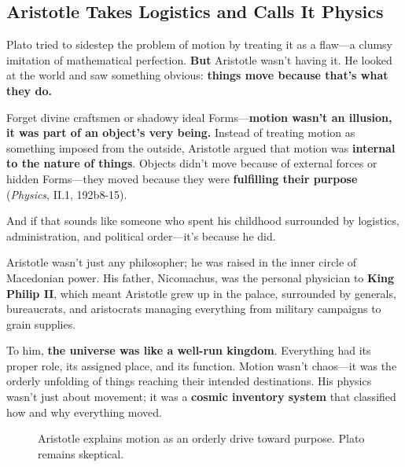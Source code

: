 \subsection{Aristotle Takes Logistics and Calls It Physics}

Plato tried to sidestep the problem of motion by treating it as a flaw—a clumsy imitation of mathematical perfection. \textbf{But} Aristotle wasn’t having it. He looked at the world and saw something obvious: \textbf{things move because that’s what they do.}  

Forget divine craftsmen or shadowy ideal Forms—\textbf{motion wasn’t an illusion, it was part of an object’s very being.} Instead of treating motion as something imposed from the outside, Aristotle argued that motion was \textbf{internal to the nature of things}. Objects didn’t move because of external forces or hidden Forms—they moved because they were \textbf{fulfilling their purpose} (\textit{Physics}, II.1, 192b8-15).  

And if that sounds like someone who spent his childhood surrounded by logistics, administration, and political order—it’s because he did.  

Aristotle wasn’t just any philosopher; he was raised in the inner circle of Macedonian power. His father, Nicomachus, was the personal physician to \textbf{King Philip II}, which meant Aristotle grew up in the palace, surrounded by generals, bureaucrats, and aristocrats managing everything from military campaigns to grain supplies.  

To him, \textbf{the universe was like a well-run kingdom}. Everything had its proper role, its assigned place, and its function. Motion wasn’t chaos—it was the orderly unfolding of things reaching their intended destinations. His physics wasn’t just about movement; it was a \textbf{cosmic inventory system} that classified how and why everything moved.  


\begin{figure}[H]
\centering
{}
\caption{Aristotle explains motion as an orderly drive toward purpose. Plato remains skeptical.}
\end{figure}

